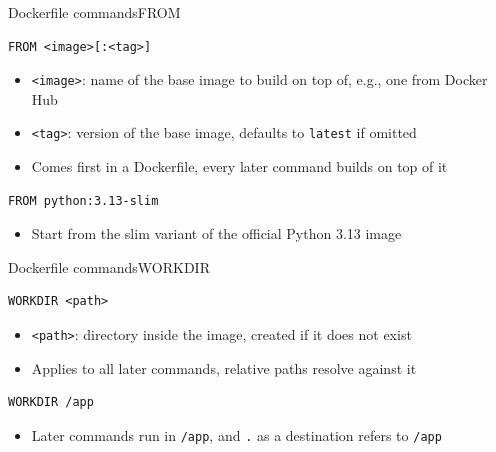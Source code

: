 \documentclass[aspectratio=169]{beamer}
\begin{document}
\begin{frame}[fragile]{Dockerfile commands}{FROM}
  \begin{verbatim}
FROM <image>[:<tag>]
  \end{verbatim}
  \begin{itemize}
    \item \texttt{<image>}: name of the base image to build on top of, e.g., one from Docker Hub
    \item \texttt{<tag>}: version of the base image, defaults to \texttt{latest} if omitted
    \item Comes first in a Dockerfile, every later command builds on top of it
  \end{itemize}

  \vspace{1em}

  \begin{verbatim}
FROM python:3.13-slim
  \end{verbatim}
  \begin{itemize}
    \item Start from the slim variant of the official Python 3.13 image
  \end{itemize}

\note{
}
\end{frame}


\begin{frame}[fragile]{Dockerfile commands}{WORKDIR}
  \begin{verbatim}
WORKDIR <path>
  \end{verbatim}
  \begin{itemize}
    \item \texttt{<path>}: directory inside the image, created if it does not exist
    \item Applies to all later commands, relative paths resolve against it
  \end{itemize}

  \vspace{1em}

  \begin{verbatim}
WORKDIR /app
  \end{verbatim}
  \begin{itemize}
    \item Later commands run in \texttt{/app}, and \texttt{.} as a destination refers to \texttt{/app}
  \end{itemize}

\note{
}
\end{frame}
\end{document}
